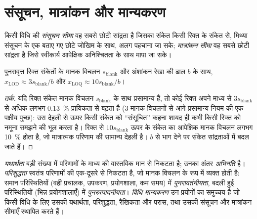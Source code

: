 \section{संसूचन, मात्रांकन और मान्यकरण}

\begin{definition}[सीमाएँ]\label{def:b2:measurement-statistics:limits}
किसी विधि की \emph{संसूचन सीमा} वह सबसे छोटी सांद्रता है जिसका
संकेत किसी रिक्त के संकेत से, मिथ्या संसूचन के एक बताए गए छोटे जोखिम के साथ, अलग पहचाना जा सके;
\emph{मात्रांकन सीमा} वह सबसे छोटी सांद्रता है जिसे
स्वीकार्य आपेक्षिक अनिश्चितता के साथ मापा जा सके।
\end{definition}

\begin{proposition}[सामान्य आकलन]\label{prop:b2:measurement-statistics:lod}
पुनरावृत्त रिक्त संकेतों के मानक विचलन $s_{\mathrm{blank}}$ और
अंशांकन रेखा की ढाल $b$ के साथ, $x_{\mathrm{LOD}} \approx 3s_{\mathrm{blank}}/b$ और $x_{\mathrm{LOQ}} \approx
10s_{\mathrm{blank}}/b$।
\end{proposition}

\begin{proof}[तर्क]
यदि रिक्त संकेत मानक विचलन $s_{\mathrm{blank}}$ के साथ प्रसामान्य हैं, तो कोई रिक्त अपने माध्य से
$3s_{\mathrm{blank}}$ से अधिक लगभग 0.13~\% प्रायिकता से बढ़ता है (3 मानक विचलनों से आगे प्रसामान्य नियम की
एक-पक्षीय पुच्छ): उस देहली से ऊपर किसी संकेत को ``संसूचित'' कहना शायद ही कभी किसी रिक्त को
नमूना समझने की भूल करता है। रिक्त से $10s_{\mathrm{blank}}$ ऊपर के संकेत का आपेक्षिक मानक विचलन लगभग
10~\% होता है, जो मात्रात्मक परिणाम की सामान्य देहली है। $b$ से भाग देने पर संकेत
सांद्रताओं में बदल जाते हैं।
\end{proof}

\begin{definition}[मान्यकरण]\label{def:b2:measurement-statistics:validation}
\emph{यथार्थता} बड़ी संख्या में परिणामों के माध्य की वास्तविक
मान से निकटता है; उनका अंतर \emph{अभिनति} है। \emph{परिशुद्धता}
स्वतंत्र परिणामों की एक-दूसरे से निकटता है, जो मानक विचलन के रूप में व्यक्त होती है:
समान परिस्थितियों (वही प्रचालक, उपकरण,
प्रयोगशाला, कम समय) में \emph{पुनरावर्तनीयता}, बदली हुई परिस्थितियों
(भिन्न प्रयोगशालाएँ) में \emph{पुनरुत्पादनीयता}। \emph{विधि मान्यकरण} उन प्रयोगों का समुच्चय है
जो किसी विधि के लिए उसकी यथार्थता, परिशुद्धता, रैखिकता और परास, तथा उसकी संसूचन
और मात्रांकन सीमाएँ स्थापित करते हैं।
\end{definition}

